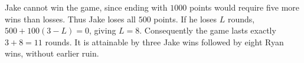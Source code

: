 Jake cannot win the game, since ending with $1000$ points would require five more wins than losses. Thus Jake loses all $500$ points. If he loses $L$ rounds, $500+100(3-L)=0$, giving $L=8$. Consequently the game lasts exactly $3+8=\boxed{11}$ rounds. It is attainable by three Jake wins followed by eight Ryan wins, without earlier ruin.
